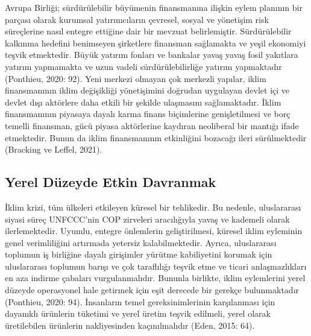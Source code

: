 \documentclass[
]{book}
\begin{document}
Avrupa Birliği; sürdürülebilir büyümenin finansmanına ilişkin eylem planının bir parçası olarak kurumsal yatırımcıların çevresel, sosyal ve yönetişim risk süreçlerine nasıl entegre ettiğine dair bir mevzuat belirlemiştir. Sürdürülebilir kalkınma hedefini benimseyen şirketlere finansman sağlamakta ve yeşil ekonomiyi teşvik etmektedir. Büyük yatırım fonları ve bankalar yavaş yavaş fosil yakıtlara yatırım yapmamakta ve uzun vadeli sürdürülebilirliğe yatırım yapmaktadır (Ponthieu, 2020: 92). Yeni merkezi olmayan çok merkezli yapılar, iklim finansmanının iklim değişikliği yönetişimini doğrudan uygulayan devlet içi ve devlet dışı aktörlere daha etkili bir şekilde ulaşmasını sağlamaktadır. İklim finansmanının piyasaya dayalı karma finans biçimlerine genişletilmesi ve borç temelli finansman, gücü piyasa aktörlerine kaydıran neoliberal bir mantığı ifade etmektedir. Bunun da iklim finansmanının etkinliğini bozacağı ileri sürülmektedir (Bracking ve Leffel, 2021).

\hypertarget{yerel-duxfczeyde-etkin-davranmak}{%
\subsection{Yerel Düzeyde Etkin Davranmak}\label{yerel-duxfczeyde-etkin-davranmak}}

İklim krizi, tüm ülkeleri etkileyen küresel bir tehlikedir. Bu nedenle, uluslararası siyasi süreç UNFCCC'nin COP zirveleri aracılığıyla yavaş ve kademeli olarak ilerlemektedir. Uyumlu, entegre önlemlerin geliştirilmesi, küresel iklim eyleminin genel verimliliğini artırmada yetersiz kalabilmektedir. Ayrıca, uluslararası toplumun iş birliğine dayalı girişimler yürütme kabiliyetini korumak için uluslararası toplumun barışı ve çok taraflılığı teşvik etme ve ticari anlaşmazlıkları en aza indirme çabaları vurgulanmalıdır. Bununla birlikte, iklim eylemlerini yerel düzeyde operasyonel hale getirmek için eşit derecede bir gerekçe bulunmaktadır (Ponthieu, 2020: 94). İnsanların temel gereksinimlerinin karşılanması için dayanıklı ürünlerin tüketimi ve yerel üretim teşvik edilmeli, yerel olarak üretilebilen ürünlerin nakliyesinden kaçınılmalıdır (Eden, 2015: 64).
\end{document}

